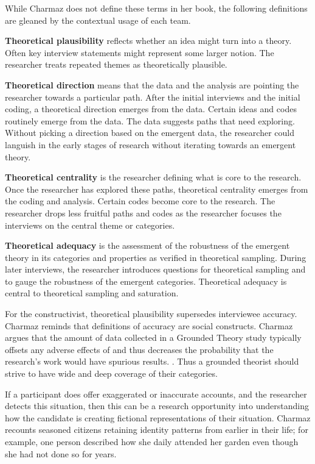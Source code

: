 While Charmaz does not define these terms in her book, the following definitions are gleaned by the contextual usage of each team.

\textbf{Theoretical plausibility} reflects whether an idea might turn into a theory. Often key interview statements might represent some larger notion. The researcher treats repeated themes as theoretically plausible.

\textbf{Theoretical direction} means that the data and the analysis are pointing the researcher towards a particular path. After the initial interviews and the initial coding, a theoretical direction emerges from the data. Certain ideas and codes routinely emerge from the data. The data suggests paths that need exploring. Without picking a direction based on the emergent data, the researcher could languish in the early stages of research without iterating towards an emergent theory. 

\textbf{Theoretical centrality} is the researcher defining what is core to the research. Once the researcher has explored these paths, theoretical centrality emerges from the coding and analysis. Certain codes become core to the research. The researcher drops less fruitful paths and codes as the researcher focuses the interviews on the central theme or categories. 

\textbf{Theoretical adequacy} is the assessment of the robustness of the emergent theory in its categories and properties as verified in theoretical sampling. During later interviews, the researcher introduces questions for theoretical sampling and to gauge the robustness of the emergent categories. Theoretical adequacy is central to theoretical sampling and saturation. 

For the constructivist, theoretical plausibility supersedes interviewee accuracy. Charmaz reminds that definitions of accuracy are social constructs. Charmaz argues that the amount of data collected in a Grounded Theory study typically offsets any adverse effects of  and thus decreases the probability that the research's work would have spurious results.  \cite{Charmaz}. Thus a grounded theorist should strive to have wide and deep coverage of their categories. 

If a participant does offer exaggerated or inaccurate accounts, and the researcher detects this situation, then this can be a research opportunity into understanding how the candidate is creating fictional representations of their situation. Charmaz recounts seasoned citizens retaining identity patterns from earlier in their life; for example, one person described how she daily attended her garden even though she had not done so for years.


